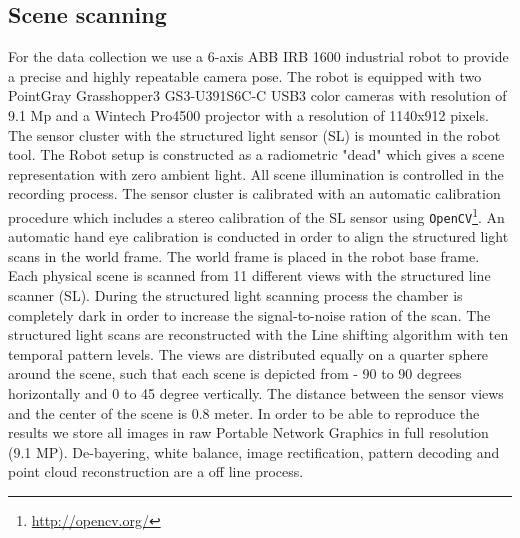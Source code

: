 \documentclass[10pt,twocolumn,letterpaper]{article}
\begin{document}
\subsection{Scene scanning}\label{sec:scene_scanning}
For the data collection we use a 6-axis ABB IRB 1600 industrial robot to provide a precise and highly repeatable camera pose. The robot is equipped with two PointGray Grasshopper3 GS3-U391S6C-C USB3 color cameras with resolution of 9.1 Mp and a Wintech Pro4500 projector with a resolution of 1140x912 pixels. The sensor cluster with the structured light sensor (SL) is mounted in the robot tool. 
The Robot setup is constructed as a radiometric "dead" which gives a scene representation with zero ambient light. All scene illumination is controlled in the recording process. The sensor cluster is calibrated with an automatic calibration procedure which includes a stereo calibration of the SL sensor using \verb|OpenCV|\footnote{\url{http://opencv.org/}}.%
An automatic hand eye calibration \cite{DornaikaHoraud1998} is conducted in order to align the structured light scans in the world frame. The world frame is placed in the robot base frame. Each physical scene is scanned from 11 different views with the structured line scanner (SL). During the structured light scanning process the chamber is completely dark in order to increase the signal-to-noise ration of the scan. The structured light scans are reconstructed with the Line shifting algorithm \cite{Guehring2000} with ten temporal pattern levels. The views are distributed equally on a quarter sphere around the scene, such that each scene is depicted from - 90 to 90 degrees horizontally and 0 to 45 degree vertically. The distance between the sensor views and the center of the scene is 0.8 meter. In order to be able to reproduce the results we store all images in raw Portable Network Graphics in full resolution (9.1 MP). De-bayering, white balance, image rectification, pattern decoding and point cloud reconstruction are a off line process.   
\end{document}
